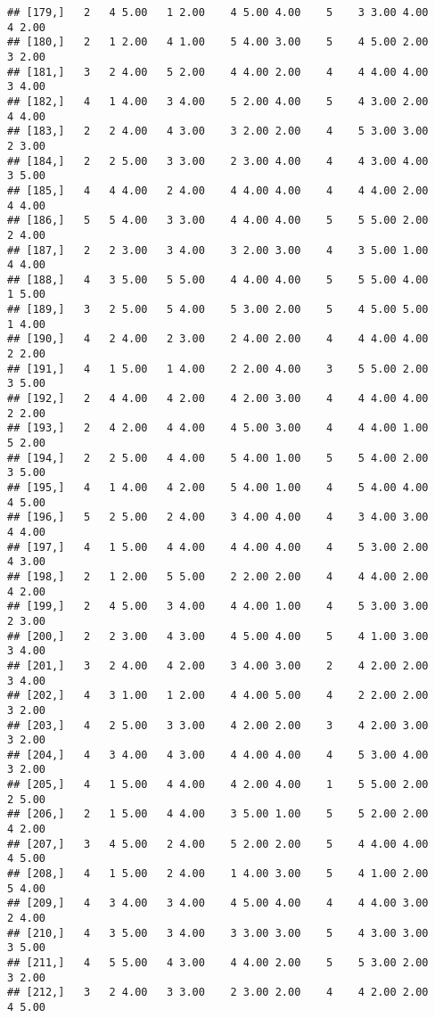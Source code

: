 \documentclass[]{article}
\begin{document}
\begin{verbatim}
## [179,]   2   4 5.00   1 2.00    4 5.00 4.00    5    3 3.00 4.00    4 2.00
## [180,]   2   1 2.00   4 1.00    5 4.00 3.00    5    4 5.00 2.00    3 2.00
## [181,]   3   2 4.00   5 2.00    4 4.00 2.00    4    4 4.00 4.00    3 4.00
## [182,]   4   1 4.00   3 4.00    5 2.00 4.00    5    4 3.00 2.00    4 4.00
## [183,]   2   2 4.00   4 3.00    3 2.00 2.00    4    5 3.00 3.00    2 3.00
## [184,]   2   2 5.00   3 3.00    2 3.00 4.00    4    4 3.00 4.00    3 5.00
## [185,]   4   4 4.00   2 4.00    4 4.00 4.00    4    4 4.00 2.00    4 4.00
## [186,]   5   5 4.00   3 3.00    4 4.00 4.00    5    5 5.00 2.00    2 4.00
## [187,]   2   2 3.00   3 4.00    3 2.00 3.00    4    3 5.00 1.00    4 4.00
## [188,]   4   3 5.00   5 5.00    4 4.00 4.00    5    5 5.00 4.00    1 5.00
## [189,]   3   2 5.00   5 4.00    5 3.00 2.00    5    4 5.00 5.00    1 4.00
## [190,]   4   2 4.00   2 3.00    2 4.00 2.00    4    4 4.00 4.00    2 2.00
## [191,]   4   1 5.00   1 4.00    2 2.00 4.00    3    5 5.00 2.00    3 5.00
## [192,]   2   4 4.00   4 2.00    4 2.00 3.00    4    4 4.00 4.00    2 2.00
## [193,]   2   4 2.00   4 4.00    4 5.00 3.00    4    4 4.00 1.00    5 2.00
## [194,]   2   2 5.00   4 4.00    5 4.00 1.00    5    5 4.00 2.00    3 5.00
## [195,]   4   1 4.00   4 2.00    5 4.00 1.00    4    5 4.00 4.00    4 5.00
## [196,]   5   2 5.00   2 4.00    3 4.00 4.00    4    3 4.00 3.00    4 4.00
## [197,]   4   1 5.00   4 4.00    4 4.00 4.00    4    5 3.00 2.00    4 3.00
## [198,]   2   1 2.00   5 5.00    2 2.00 2.00    4    4 4.00 2.00    4 2.00
## [199,]   2   4 5.00   3 4.00    4 4.00 1.00    4    5 3.00 3.00    2 3.00
## [200,]   2   2 3.00   4 3.00    4 5.00 4.00    5    4 1.00 3.00    3 4.00
## [201,]   3   2 4.00   4 2.00    3 4.00 3.00    2    4 2.00 2.00    3 4.00
## [202,]   4   3 1.00   1 2.00    4 4.00 5.00    4    2 2.00 2.00    3 2.00
## [203,]   4   2 5.00   3 3.00    4 2.00 2.00    3    4 2.00 3.00    3 2.00
## [204,]   4   3 4.00   4 3.00    4 4.00 4.00    4    5 3.00 4.00    3 2.00
## [205,]   4   1 5.00   4 4.00    4 2.00 4.00    1    5 5.00 2.00    2 5.00
## [206,]   2   1 5.00   4 4.00    3 5.00 1.00    5    5 2.00 2.00    4 2.00
## [207,]   3   4 5.00   2 4.00    5 2.00 2.00    5    4 4.00 4.00    4 5.00
## [208,]   4   1 5.00   2 4.00    1 4.00 3.00    5    4 1.00 2.00    5 4.00
## [209,]   4   3 4.00   3 4.00    4 5.00 4.00    4    4 4.00 3.00    2 4.00
## [210,]   4   3 5.00   3 4.00    3 3.00 3.00    5    4 3.00 3.00    3 5.00
## [211,]   4   5 5.00   4 3.00    4 4.00 2.00    5    5 3.00 2.00    3 2.00
## [212,]   3   2 4.00   3 3.00    2 3.00 2.00    4    4 2.00 2.00    4 5.00

\end{verbatim}
\end{document}
